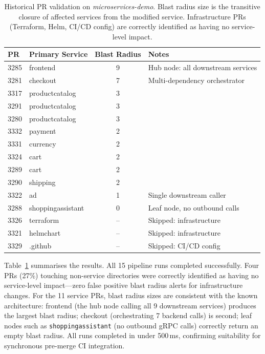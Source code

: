 \documentclass[runningheads]{llncs}
\begin{document}
\begin{table}[t]
\caption{Historical PR validation on \emph{microservices-demo}. Blast radius
  size is the transitive closure of affected services from the modified
  service. Infrastructure PRs (Terraform, Helm, CI/CD config) are correctly
  identified as having no service-level impact.}
\label{tab:history}
\centering
\small
\begin{tabular}{llcl}
\toprule
PR & Primary Service & Blast Radius & Notes \\
\midrule
3285 & frontend        & 9 & Hub node: all downstream services \\
3281 & checkout        & 7 & Multi-dependency orchestrator \\
3317 & productcatalog  & 3 & \\
3291 & productcatalog  & 3 & \\
3280 & productcatalog  & 3 & \\
3332 & payment         & 2 & \\
3331 & currency        & 2 & \\
3324 & cart            & 2 & \\
3289 & cart            & 2 & \\
3290 & shipping        & 2 & \\
3322 & ad              & 1 & Single downstream caller \\
3288 & shoppingassistant & 0 & Leaf node, no outbound calls \\
\midrule
3326 & terraform       & -- & Skipped: infrastructure \\
3321 & helmchart       & -- & Skipped: infrastructure \\
3329 & .github         & -- & Skipped: CI/CD config \\
\bottomrule
\end{tabular}
\end{table}

Table~\ref{tab:history} summarises the results. All 15 pipeline runs
completed successfully. Four PRs (27\%) touching non-service directories
were correctly identified as having no service-level impact---zero false
positive blast radius alerts for infrastructure changes. For the 11 service
PRs, blast radius sizes are consistent with the known architecture: frontend
(the hub node calling all 9 downstream services) produces the largest blast
radius; checkout (orchestrating 7 backend calls) is second; leaf nodes
such as \texttt{shoppingassistant} (no outbound gRPC calls) correctly
return an empty blast radius. All runs completed in under 500\,ms, confirming
suitability for synchronous pre-merge CI integration.
\end{document}

